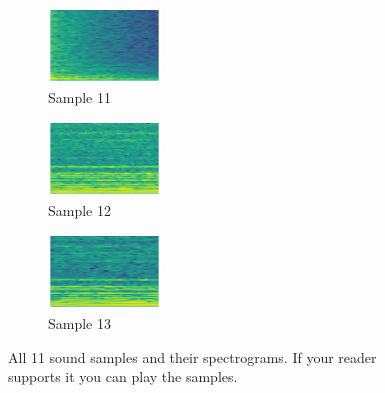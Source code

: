 \begin{figure}[H]
{
    \begin{subfigure}{0.25\textwidth}
      \includegraphics[width=3cm]{titletune/buttons/samples/tune13.mod-11.wav-spec.png}%
      \caption*{Sample 11}
    \end{subfigure}
    \begin{subfigure}{0.25\textwidth}
      \includegraphics[width=3cm]{titletune/buttons/samples/tune13.mod-12.wav-spec.png}%
      \caption*{Sample 12}
    \end{subfigure}
    \begin{subfigure}{0.25\textwidth}
      \includegraphics[width=3cm]{titletune/buttons/samples/tune13.mod-13.wav-spec.png}%
      \caption*{Sample 13}
    \end{subfigure}
}\caption*{All 11 sound samples and their spectrograms. If your reader supports it you can play the samples.}
\end{figure}

